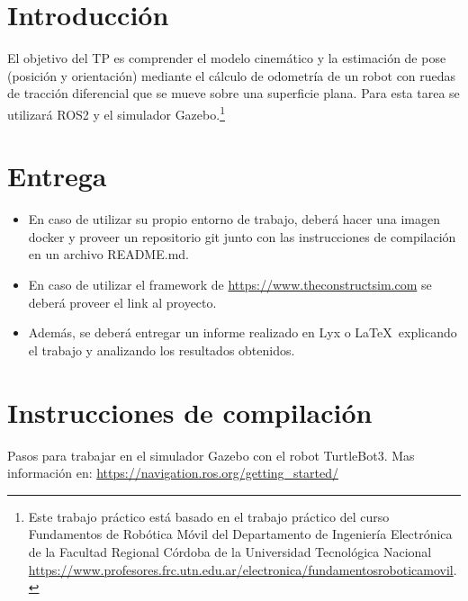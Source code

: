 \documentclass[tp]{lcc}
\begin{document}
\maketitle


\section{Introducción}

El objetivo del TP es comprender el modelo cinemático y la estimación de pose (posición y orientación) mediante el cálculo de odometría de un robot con ruedas de tracción diferencial que se mueve sobre una superficie plana. Para esta tarea se utilizará ROS2 y el simulador Gazebo.\footnote{Este trabajo práctico está basado en el trabajo práctico del curso Fundamentos de Robótica Móvil del Departamento de Ingeniería Electrónica de la Facultad Regional Córdoba de la Universidad Tecnológica Nacional \url{https://www.profesores.frc.utn.edu.ar/electronica/fundamentosroboticamovil}.}


\section{Entrega}
\begin{itemize}
    \item En caso de utilizar su propio entorno de trabajo, deberá hacer una imagen docker y proveer un repositorio git junto con las instrucciones de compilación en un archivo README.md.

    \item En caso de utilizar el framework de \url{https://www.theconstructsim.com} se deberá proveer el link al proyecto.

    \item Además, se deberá entregar un informe realizado en Lyx o \LaTeX\  explicando el trabajo y analizando los resultados obtenidos.
\end{itemize}


\section{Instrucciones de compilación}
Pasos para trabajar en el simulador Gazebo con el robot TurtleBot3. Mas información en: \url{https://navigation.ros.org/getting_started/}
\end{document}
